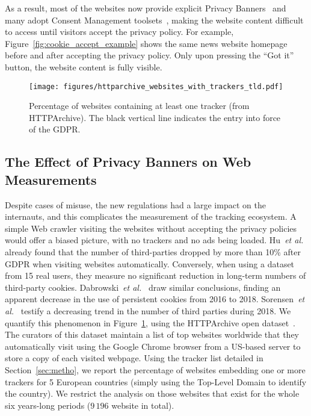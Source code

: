 As a result, most of the websites now provide explicit Privacy Banners~\cite{degeling2018we} and many adopt Consent Management toolsets~\cite{hills2020consent}, making the website content difficult to access until visitors accept the privacy policy. For example, Figure~\ref{fig:cookie_accept_example} shows the same news website homepage before and after accepting the privacy policy. Only upon pressing the ``Got it'' button, the website content is fully visible.



\begin{figure}[t]
    \centering
    \texttt{[image: figures/httparchive\_websites\_with\_trackers\_tld.pdf]}
    \caption{Percentage of websites containing at least one tracker (from HTTPArchive). The black vertical line indicates the entry into force of the GDPR.}
    \label{fig:ha_websites_trackers}
\end{figure}



\subsection{The Effect of Privacy Banners on Web Measurements}

Despite cases of misuse, the new regulations had a large impact on the internauts, and this complicates the measurement of the tracking ecosystem. A simple Web crawler visiting the websites without accepting the privacy policies would offer a biased picture, with no trackers and no ads being loaded.  Hu~\emph{et al.}~\cite{hu2019characterising} already found that the number of third-parties dropped by more than 10\% after GDPR when visiting websites automatically. Conversely, when using a dataset from 15 real users, they measure no significant reduction in long-term numbers of third-party cookies. Dabrowski~\emph{et al.}~\cite{dabrowski2019measuring} draw similar conclusions, finding an apparent decrease in the use of persistent cookies from 2016 to 2018. Sorensen~\emph{et al.}~\cite{sorensen2019before} testify a decreasing trend in the number of third parties during 2018. We quantify this phenomenon in Figure~\ref{fig:ha_websites_trackers}, using the HTTPArchive open dataset~\cite{httparchive}. The curators of this dataset maintain a list of top websites worldwide that they automatically visit using the Google Chrome browser from a US-based server to store a copy of each visited webpage. Using the tracker list detailed in Section~\ref{sec:metho}, we report the percentage of websites embedding one or more trackers for 5 European countries (simply using the Top-Level Domain to identify the country). We restrict the analysis on those websites that exist for the whole six years-long periods ($9\,196$ website in total).

